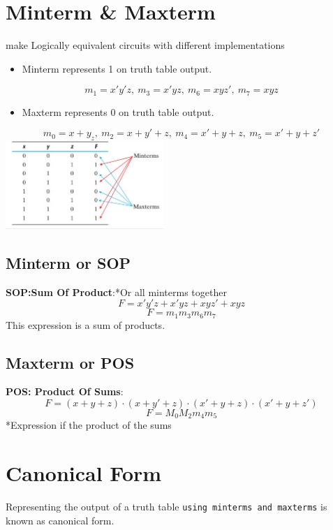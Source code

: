 \documentclass[a4paper,12pt]{article}
\begin{document}
            \section*{Minterm \& Maxterm}
            make Logically equivalent circuits with different implementations
                \begin{itemize}
                    \item Minterm represents 1 on truth table output.
                \end{itemize}
                \[m_1=x'y'z,~m_3=x'yz,~m_6=xyz',~m_7=xyz\]
                \begin{itemize}
                    \item Maxterm represents 0 on truth table output.
                \end{itemize}
                \[m_0=x+y_z,~m_2=x+y'+z,~m_4=x'+y+z,~m_5=x'+y+z'\]
                \includegraphics*[width=6cm]{MintermsMaxterms.jpg}
                    
            \subsection*{Minterm or SOP}
            \textbf{SOP:Sum Of Product}:*Or all minterms together \[F=x'y'z+x'yz+xyz'+xyz\] \[F=m_1m_3m_6m_7\]
            This expression is a sum of products.
            \subsection*{Maxterm or POS}
            \textbf{POS: Product Of Sums}: \[F=(x+y+z)\cdot(x+y'+z)\cdot(x'+y+z)\cdot(x'+y+z')\] \[F=M_0M_2m_4m_5\] *Expression if the product of the sums

            \section*{Canonical Form} 
            Representing the output of a truth table \texttt{using minterms and maxterms} is known as canonical form.
\end{document}
